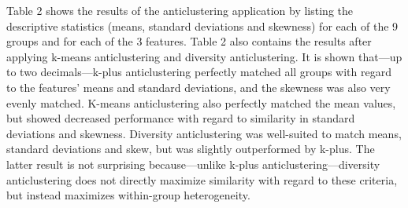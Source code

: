 \documentclass[
  man,floatsintext]{apa7}
\begin{document}
Table 2 shows the results of the anticlustering application by listing the descriptive statistics (means, standard deviations and skewness) for each of the 9 groups and for each of the 3 features. Table 2 also contains the results after applying k-means anticlustering and diversity anticlustering. It is shown that---up to two decimals---k-plus anticlustering perfectly matched all groups with regard to the features' means and standard deviations, and the skewness was also very evenly matched. K-means anticlustering also perfectly matched the mean values, but showed decreased performance with regard to similarity in standard deviations and skewness. Diversity anticlustering was well-suited to match means, standard deviations and skew, but was slightly outperformed by k-plus. The latter result is not surprising because---unlike k-plus anticlustering---diversity anticlustering does not directly maximize similarity with regard to these criteria, but instead maximizes within-group heterogeneity.
\end{document}
